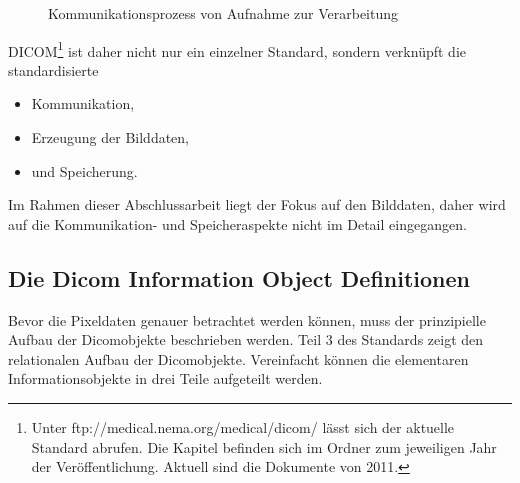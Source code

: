 \begin{figure}[htbp]
  \vspace{0.5cm}
  \centering
  \caption{Kommunikationsprozess von Aufnahme zur Verarbeitung}
  \label{communication}
  \vspace{0.5cm}
\end{figure}

DICOM\footnote{Unter ftp://medical.nema.org/medical/dicom/ lässt sich der aktuelle Standard abrufen. Die Kapitel befinden sich im Ordner zum jeweiligen Jahr der Veröffentlichung. Aktuell sind die Dokumente von 2011.} ist daher nicht nur ein einzelner Standard, sondern verknüpft die standardisierte 
\begin{itemize}
\item Kommunikation,
\item Erzeugung der Bilddaten,
\item und Speicherung.
\end{itemize}
Im Rahmen dieser Abschlussarbeit liegt der Fokus auf den Bilddaten, daher wird auf die Kommunikation- und Speicheraspekte nicht im Detail eingegangen.

\subsection{Die Dicom Information Object Definitionen} \label{grundlagen:iod}
Bevor die Pixeldaten genauer betrachtet werden können, muss der prinzipielle Aufbau der Dicomobjekte beschrieben werden. Teil 3 des Standards\cite[A.1.2]{dicom:iod} zeigt den relationalen Aufbau der Dicomobjekte. Vereinfacht können die elementaren Informationsobjekte in drei Teile aufgeteilt werden.

